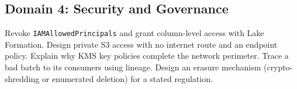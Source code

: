 \subsection*{Domain 4: Security and Governance}
\begin{itemize}
\chk Revoke \texttt{IAMAllowedPrincipals} and grant column-level access with Lake Formation.
\chk Design private S3 access with no internet route and an endpoint policy.
\chk Explain why KMS key policies complete the network perimeter.
\chk Trace a bad batch to its consumers using lineage.
\chk Design an erasure mechanism (crypto-shredding or enumerated deletion) for a stated
regulation.
\end{itemize}
